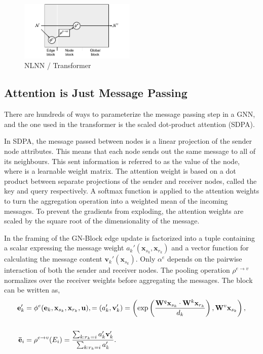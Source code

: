 \begin{figure}
    \centering
    \includegraphics[width=0.49\textwidth]{Figures/transformers/nonlocal.pdf}
    \caption{NLNN / Transformer}
    \label{fig:Transformer}
\end{figure}

\subsection{Attention is Just Message Passing}

There are hundreds of ways to parameterize the message passing step in a GNN, and the one used in the transformer is the scaled dot-product attention (SDPA).

In SDPA, the message passed between nodes is a linear projection of the sender node attributes.
This means that each node sends out the same message to all of its neighbours.
This sent information is referred to as the value of the node, where is a learnable weight matrix.
The attention weight is based on a dot product between separate projections of the sender and receiver nodes, called the key and query respectively.
A softmax function is applied to the attention weights to turn the aggregation operation into a weighted mean of the incoming messages.
To prevent the gradients from exploding, the attention weights are scaled by the square root of the dimensionality of the message.

In the framing of the GN-Block edge update is factorized into a tuple containing a scalar expressing the message weight $a_k'(\mathbf{x}_{s_k}, \mathbf{x}_{r_k})$ and a vector function for calculating the message content $\mathbf{v}_k'(\mathbf{x}_{s_k})$.
Only $\alpha^e$ depends on the pairwise interaction of both the sender and receiver nodes.
The pooling operation $\rho^{e \to v}$ normalizes over the receiver weights before aggregating the messages.
The block can be written as,
\begin{equation}
    \begin{aligned}
        \mathbf{e}_k' &= \phi^e(\mathbf{e}_k, \mathbf{x}_{s_k}, \mathbf{x}_{r_k}, \mathbf{u}),
        = ( a_k', \mathbf{v}_k' )
        = \left( \exp \left( \frac{\mathbf{W}^q \mathbf{x}_{s_k} \cdot \mathbf{W}^k \mathbf{x}_{r_k}}{d_k} \right), \mathbf{W}^v \mathbf{x}_{s_k} \right), \\
        \vphantom{x}\\
        \mathbf{\bar{e}}_i &= \rho^{e \to v}(E_i)
        = \frac{\sum_{k: r_k = i} a_k' \mathbf{v}_k'}{\sum_{k: r_k = i} a_k'}.
    \end{aligned}
\end{equation}


